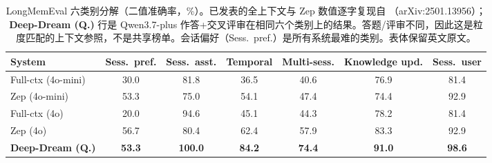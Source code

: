 \begin{table}[t]
\centering
\caption{LongMemEval 六类别分解（二值准确率，\%）。已发表的全上下文与 Zep 数值逐字复现自 \citet{rasmussen2025zep}（arXiv:2501.13956）；\textbf{Deep-Dream (Q.)} 行是 Qwen3.7-plus 作答+交叉评审在相同六个类别上的结果。答题/评审不同，因此这是粒度匹配的上下文参照，不是共享榜单。会话偏好（Sess.\ pref.）是所有系统最难的类别。表体保留英文原文。}
\label{tab:zep-longmemeval-cat}
\footnotesize
\setlength{\tabcolsep}{3.5pt}
\begin{tabular}{lcccccc}
\toprule
System & Sess.\ pref. & Sess.\ asst. & Temporal & Multi-sess. & Knowledge upd. & Sess.\ user \\
\midrule
Full-ctx (4o-mini) & 30.0 & 81.8 & 36.5 & 40.6 & 76.9 & 81.4 \\
Zep (4o-mini) & 53.3 & 75.0 & 54.1 & 47.4 & 74.4 & 92.9 \\
Full-ctx (4o) & 20.0 & 94.6 & 45.1 & 44.3 & 78.2 & 81.4 \\
Zep (4o) & 56.7 & 80.4 & 62.4 & 57.9 & 83.3 & 92.9 \\
\textbf{Deep-Dream (Q.)} & \textbf{53.3} & \textbf{100.0} & \textbf{84.2} & \textbf{74.4} & \textbf{91.0} & \textbf{98.6} \\
\bottomrule
\end{tabular}
\end{table}
